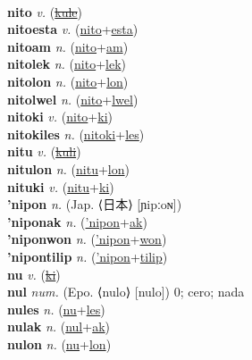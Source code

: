  \label{nitapic} \\
\textbf{nito} \textit{v.} (\hyperref[kule]{\sout{kule}})
 \label{nito} \\
\textbf{nitoesta} \textit{v.} (\hyperref[nito]{nito}+\hyperref[esta]{esta})
 \label{nitoesta} \\
\textbf{nitoam} \textit{n.} (\hyperref[nito]{nito}+\hyperref[am]{am})
 \label{nitoam} \\
\textbf{nitolek} \textit{n.} (\hyperref[nito]{nito}+\hyperref[lek]{lek})
 \label{nitolek} \\
\textbf{nitolon} \textit{n.} (\hyperref[nito]{nito}+\hyperref[lon]{lon})
 \label{nitolon} \\
\textbf{nitolwel} \textit{n.} (\hyperref[nito]{nito}+\hyperref[lwel]{lwel})
 \label{nitolwel} \\
\textbf{nitoki} \textit{v.} (\hyperref[nito]{nito}+\hyperref[ki]{ki})
 \label{nitoki} \\
\textbf{nitokiles} \textit{n.} (\hyperref[nitoki]{nitoki}+\hyperref[les]{les})
 \label{nitokiles} \\
\textbf{nitu} \textit{v.} (\hyperref[kuli]{\sout{kuli}})
 \label{nitu} \\
\textbf{nitulon} \textit{n.} (\hyperref[nitu]{nitu}+\hyperref[lon]{lon})
 \label{nitulon} \\
\textbf{nituki} \textit{v.} (\hyperref[nitu]{nitu}+\hyperref[ki]{ki})
 \label{nituki} \\
\textbf{'nipon} \textit{n.} (Jap. ⟨日本⟩ [ɲipːoɴ])
 \label{'nipon} \\
\textbf{'niponak} \textit{n.} (\hyperref['nipon]{'nipon}+\hyperref[ak]{ak})
 \label{'niponak} \\
\textbf{'niponwon} \textit{n.} (\hyperref['nipon]{'nipon}+\hyperref[won]{won})
 \label{'niponwon} \\
\textbf{'nipontilip} \textit{n.} (\hyperref['nipon]{'nipon}+\hyperref[tilip]{tilip})
 \label{'nipontilip} \\
\textbf{nu} \textit{v.} (\hyperref[ki]{\sout{ki}})
 \label{nu} \\
\textbf{nul} \textit{num.} (Epo. ⟨nulo⟩ [nulo])
0; cero; nada \label{nul} \\
\textbf{nules} \textit{n.} (\hyperref[nu]{nu}+\hyperref[les]{les})
 \label{nules} \\
\textbf{nulak} \textit{n.} (\hyperref[nul]{nul}+\hyperref[ak]{ak})
 \label{nulak} \\
\textbf{nulon} \textit{n.} (\hyperref[nu]{nu}+\hyperref[lon]{lon})
 \label{nulon} \\
